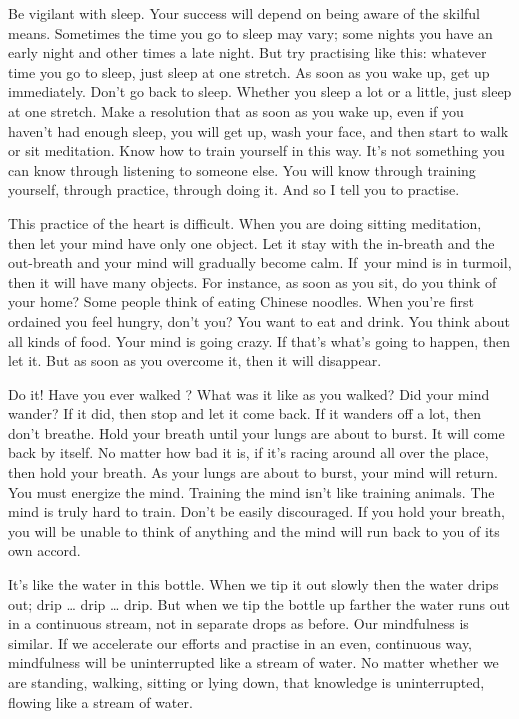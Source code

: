  Be vigilant with sleep. Your success will depend on being aware of the skilful means. Sometimes the time you go to sleep may vary; some nights you have an early night and other times a late night. But try practising like this: whatever time you go to sleep, just sleep at one stretch. As soon as you wake up, get up immediately. Don't go back to sleep. Whether you sleep a lot or a little, just sleep at one stretch. Make a resolution that as soon as you wake up, even if you haven't had enough sleep, you will get up, wash your face, and then start to walk  or sit meditation. Know how to train yourself in this way. It's not something you can know through listening to someone else. You will know through training yourself, through practice, through doing it. And so I tell you to practise. 

 This practice of the heart is difficult. When you are doing sitting meditation, then let your mind have only one object. Let it stay with the in-breath and the out-breath and your mind will gradually become calm. If~your mind is in turmoil, then it will have many objects. For instance, as soon as you sit, do you think of your home? Some people think of eating Chinese noodles. When you're first ordained you feel hungry, don't you? You want to eat and drink. You think about all kinds of food. Your mind is going crazy. If that's what's going to happen, then let it. But as soon as you overcome it, then it will disappear. 

 Do it! Have you ever walked ? What was it like as you walked? Did your mind wander? If it did, then stop and let it come back. If it wanders off a lot, then don't breathe. Hold your breath until your lungs are about to burst. It will come back by itself. No matter how bad it is, if it's racing around all over the place, then hold your breath. As your lungs are about to burst, your mind will return. You must energize the mind. Training the mind isn't like training animals. The mind is truly hard to train. Don't be easily discouraged. If you hold your breath, you will be unable to think of anything and the mind will run back to you of its own accord. 

 It's like the water in this bottle. When we tip it out slowly then the water drips out; drip \ldots{} drip \ldots{} drip. But when we tip the bottle up farther the water runs out in a continuous stream, not in separate drops as before. Our mindfulness is similar. If we accelerate our efforts and practise in an even, continuous way, mindfulness will be uninterrupted like a stream of water. No matter whether we are standing, walking, sitting or lying down, that knowledge is uninterrupted, flowing like a stream of water. 

